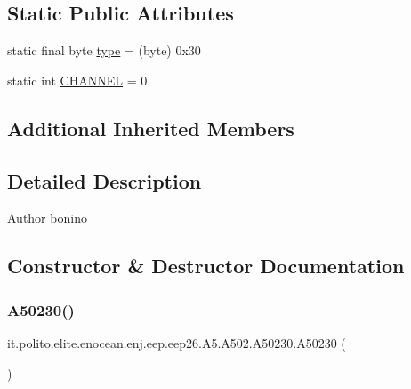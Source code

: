 \subsection*{Static Public Attributes}
\begin{DoxyCompactItemize}
\item 
static final byte \hyperlink{classit_1_1polito_1_1elite_1_1enocean_1_1enj_1_1eep_1_1eep26_1_1_a5_1_1_a502_1_1_a50230_a092afb56eb2acdcdabafea9afd05f534}{type} = (byte) 0x30
\item 
static int \hyperlink{classit_1_1polito_1_1elite_1_1enocean_1_1enj_1_1eep_1_1eep26_1_1_a5_1_1_a502_1_1_a50230_a5a59eb332ac1ca5c471532f237335afd}{C\+H\+A\+N\+N\+EL} = 0
\end{DoxyCompactItemize}
\subsection*{Additional Inherited Members}


\subsection{Detailed Description}
\begin{DoxyAuthor}{Author}
bonino 
\end{DoxyAuthor}


\subsection{Constructor \& Destructor Documentation}
\hypertarget{classit_1_1polito_1_1elite_1_1enocean_1_1enj_1_1eep_1_1eep26_1_1_a5_1_1_a502_1_1_a50230_a6367acf017ca1f7690b10d9ebea7a6bf}{}\label{classit_1_1polito_1_1elite_1_1enocean_1_1enj_1_1eep_1_1eep26_1_1_a5_1_1_a502_1_1_a50230_a6367acf017ca1f7690b10d9ebea7a6bf} 
\subsubsection{\texorpdfstring{A50230()}{A50230()}}
{\footnotesize\ttfamily it.\+polito.\+elite.\+enocean.\+enj.\+eep.\+eep26.\+A5.\+A502.\+A50230.\+A50230 (\begin{DoxyParamCaption}{ }\end{DoxyParamCaption})}


